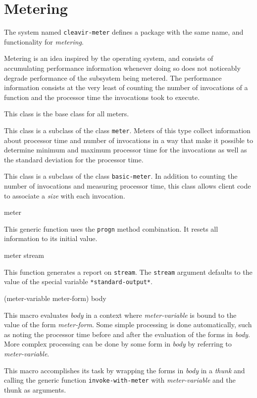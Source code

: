 \chapter{Metering}

The system named \texttt{cleavir-meter} defines a package with the
same name, and functionality for \emph{metering}. 

Metering is an idea inspired by the \multics{} operating system, and
consists of accumulating performance information whenever doing so
does not noticeably degrade performance of the subsystem being
metered.  The performance information consists at the very least of
counting the number of invocations of a function and the processor
time the invocations took to execute.


This class is the base class for all meters.


This class is a subclass of the class \texttt{meter}.  Meters of this
type collect information about processor time and number of
invocations in a way that make it possible to determine minimum and
maximum processor time for the invocations as well as the standard
deviation for the processor time.


This class is a subclass of the class \texttt{basic-meter}.  In
addition to counting the number of invocations and measuring processor
time, this class allows client code to associate a \emph{size} with
each invocation.

 {meter}

This generic function uses the \texttt{progn} method combination.  It
resets all information to its initial value.

 {meter \optional{} stream}

This function generates a report on \texttt{stream}.
The \texttt{stream} argument defaults to the value of the special
variable \texttt{*standard-output*}.

 {(meter-variable meter-form) \body{} body}

This macro evaluates \textit{body} in a context where
\textit{meter-variable} is bound to the value of the form
\textit{meter-form}.  Some simple processing is done automatically,
such as noting the processor time before and after the evaluation of
the forms in \textit{body}.  More complex processing can be done by
some form in \textit{body} by referring to \textit{meter-variable}.

This macro accomplishes its task by wrapping the forms in
\textit{body} in a \emph{thunk} and calling the generic function
\texttt{invoke-with-meter} with \textit{meter-variable} and the thunk
as arguments.
